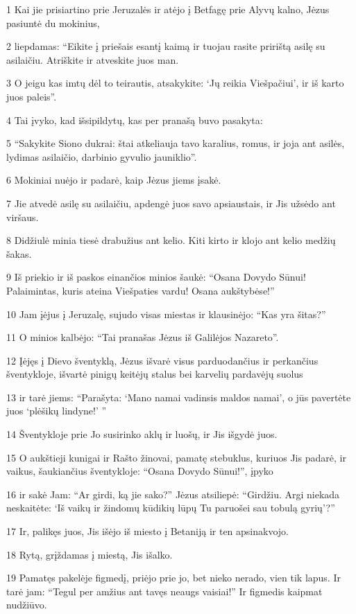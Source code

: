\par 1 Kai jie prisiartino prie Jeruzalės ir atėjo į Betfagę prie Alyvų kalno, Jėzus pasiuntė du mokinius, 
\par 2 liepdamas: “Eikite į priešais esantį kaimą ir tuojau rasite pririštą asilę su asilaičiu. Atriškite ir atveskite juos man. 
\par 3 O jeigu kas imtų dėl to teirautis, atsakykite: ‘Jų reikia Viešpačiui’, ir iš karto juos paleis”. 
\par 4 Tai įvyko, kad išsipildytų, kas per pranašą buvo pasakyta: 
\par 5 “Sakykite Siono dukrai: štai atkeliauja tavo karalius, romus, ir joja ant asilės, lydimas asilaičio, darbinio gyvulio jauniklio”. 
\par 6 Mokiniai nuėjo ir padarė, kaip Jėzus jiems įsakė. 
\par 7 Jie atvedė asilę su asilaičiu, apdengė juos savo apsiaustais, ir Jis užsėdo ant viršaus. 
\par 8 Didžiulė minia tiesė drabužius ant kelio. Kiti kirto ir klojo ant kelio medžių šakas. 
\par 9 Iš priekio ir iš paskos einančios minios šaukė: “Osana Dovydo Sūnui! Palaimintas, kuris ateina Viešpaties vardu! Osana aukštybėse!” 
\par 10 Jam įėjus į Jeruzalę, sujudo visas miestas ir klausinėjo: “Kas yra šitas?” 
\par 11 O minios kalbėjo: “Tai pranašas Jėzus iš Galilėjos Nazareto”. 
\par 12 Įėjęs į Dievo šventyklą, Jėzus išvarė visus parduodančius ir perkančius šventykloje, išvartė pinigų keitėjų stalus bei karvelių pardavėjų suolus 
\par 13 ir tarė jiems: “Parašyta: ‘Mano namai vadinsis maldos namai’, o jūs pavertėte juos ‘plėšikų lindyne!’ ” 
\par 14 Šventykloje prie Jo susirinko aklų ir luošų, ir Jis išgydė juos. 
\par 15 O aukštieji kunigai ir Rašto žinovai, pamatę stebuklus, kuriuos Jis padarė, ir vaikus, šaukiančius šventykloje: “Osana Dovydo Sūnui!”, įpyko 
\par 16 ir sakė Jam: “Ar girdi, ką jie sako?” Jėzus atsiliepė: “Girdžiu. Argi niekada neskaitėte: ‘Iš vaikų ir žindomų kūdikių lūpų Tu paruošei sau tobulą gyrių’?” 
\par 17 Ir, palikęs juos, Jis išėjo iš miesto į Betaniją ir ten apsinakvojo. 
\par 18 Rytą, grįždamas į miestą, Jis išalko. 
\par 19 Pamatęs pakelėje figmedį, priėjo prie jo, bet nieko nerado, vien tik lapus. Ir tarė jam: “Tegul per amžius ant tavęs neaugs vaisiai!” Ir figmedis kaipmat nudžiūvo. 
